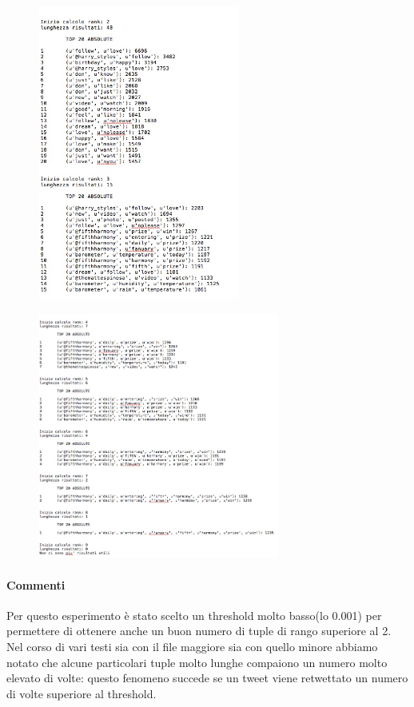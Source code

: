 \documentclass{article}
\begin{document}
\newpage
\begin{figure}[h]
  \begin{center}
  \includegraphics[width=250px]{2code.jpeg}
  \end{center}
\end{figure}

\newpage
\begin{figure}[h]
  \begin{center}
  \includegraphics[width=300px]{3code.jpg}
  \end{center}
\end{figure}

\newpage
\paragraph{Commenti}
Per questo esperimento è stato scelto un threshold molto basso(lo 0.001) per permettere di ottenere anche un buon numero di tuple di rango superiore al 2.\\
Nel corso di vari testi sia con il file maggiore sia con quello minore abbiamo notato che alcune particolari tuple molto lunghe compaiono un numero molto elevato di volte: questo fenomeno succede se un tweet viene retwettato un numero di volte superiore al threshold.
\end{document}
